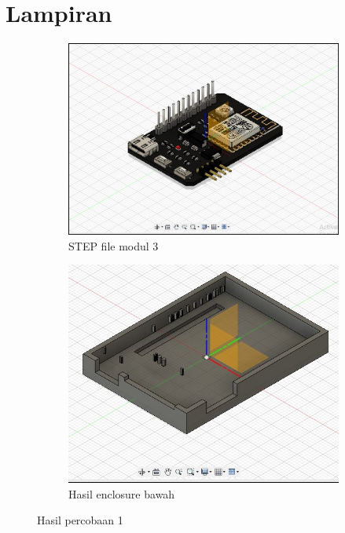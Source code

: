 \section*{Lampiran} %


\begin{figure}[H]
  \centering
  \begin{subfigure}[c]{0.4\linewidth}
    \centering
    \includegraphics[width=\linewidth]{img/modul_3/file_step_modul_3.jpg}
    \caption{STEP file modul 3\label{fig:inisub1}}
  \end{subfigure}
  \hspace{1cm}
  \begin{subfigure}[c]{0.4\linewidth}
    \centering
    \includegraphics[width=\linewidth]{img/modul_3/enclosure_bawah.jpg}
    \caption{Hasil enclosure bawah \label{fig:inisub2}}
  \end{subfigure}
  \caption{Hasil percobaan 1 \label{fig:keduagambar}}
\end{figure}

